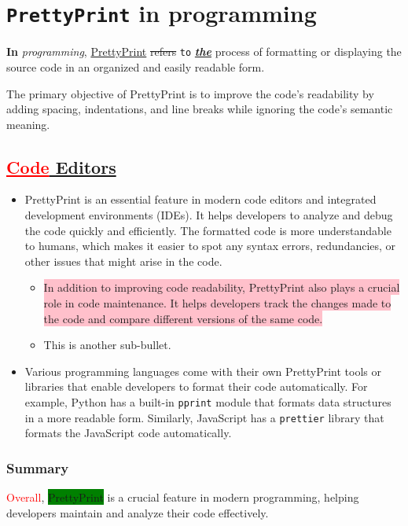 \documentclass[12pt, a4paper]{article}
\begin{document}
\section{\texttt{PrettyPrint} in programming}
\textbf{In} \textit{programming}, \underline{PrettyPrint} \sout{refers} \texttt{to} \underline{\textbf{\textit{the}}} process of formatting or displaying the source code in an organized and easily readable form. 

	The primary objective of PrettyPrint is to improve the code's readability by adding spacing, indentations, and line breaks while ignoring the code's semantic meaning.

\subsection{\textcolor{red}{\underline{Code}}\underline{ Editors}}
\begin{itemize}
	\item PrettyPrint is an essential feature in modern code editors and integrated development environments (IDEs). It helps developers to analyze and debug the code quickly and efficiently. The formatted code is more understandable to humans, which makes it easier to spot any syntax errors, redundancies, or other issues that might arise in the code.
	\begin{itemize}
	\item \colorbox{pink}{In addition to improving code readability, PrettyPrint also plays a crucial role in code maintenance. It helps developers track the changes made to the code and compare different versions of the same code.}
\end{itemize}
		\begin{itemize}
	\item This is another sub-bullet.
\end{itemize}
	\item Various programming languages come with their own PrettyPrint tools or libraries that enable developers to format their code automatically. For example, Python has a built-in \texttt{pprint} module that formats data structures in a more readable form. Similarly, JavaScript has a \texttt{prettier} library that formats the JavaScript code automatically.
\end{itemize}
\subsubsection{Summary}
\textcolor{red}{Overall}, \colorbox{green}{PrettyPrint} is a crucial feature in modern programming, helping developers maintain and analyze their code effectively.
\end{document}
